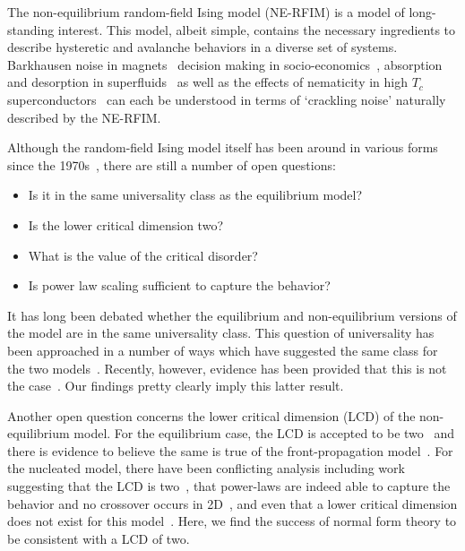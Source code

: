 \documentclass[reprint,amsmath,amssymb,aps,floatfix]{revtex4-1}
\begin{document}
The non-equilibrium random-field Ising model (NE-RFIM) is a model of long-standing interest. This model, albeit simple, contains the necessary ingredients to describe hysteretic and avalanche behaviors in a diverse set of systems. Barkhausen noise in magnets~\cite{Bertotti98} decision making in socio-economics~\cite{Bouchaud13}, absorption and desorption in superfluids~\cite{Lilly96, Detcheverry04} as well as the effects of nematicity in high $T_c$ superconductors~\cite{Bonetti04, Carlson06, Phillabaum2012} can each be understood in terms of `crackling noise' naturally described by the NE-RFIM. \par
%
Although the random-field Ising model itself has been around in various forms since the 1970s~\cite{ImryMa75}, there are still a number of open questions:
%
\begin{itemize}
	\item Is it in the same universality class as the equilibrium model?
	\item Is the lower critical dimension two?
	\item What is the value of the critical disorder?
	\item Is power law scaling sufficient to capture the behavior?
\end{itemize}
%
It has long been debated whether the equilibrium and non-equilibrium versions of the model are in the same universality class. This question of universality has been approached in a number of ways which have suggested the same class for the two models~\cite{Maritan94, Perez-Reche04, Colaiori04, LiuDahmen09, LiuDahmen09-2,BalogTissierTarjus14}. Recently, however, evidence has been provided that this is not the case~\cite{BalogTarjusTissier18}. Our findings pretty clearly imply this latter result. \par
%
Another open question concerns the lower critical dimension (LCD) of the non-equilibrium model. For the equilibrium case, the LCD is accepted to be two~\cite{BrayMoore85} and there is evidence to believe the same is true of the front-propagation model~\cite{Drossel98}. For the nucleated model, there have been conflicting analysis including work suggesting that the LCD is two~\cite{Perkovic95,Perkovic96}, that power-laws are indeed able to capture the behavior and no crossover occurs in 2D~\cite{Spasojevic11, Spasojevic11-2}, and even that a lower critical dimension does not exist for this model~\cite{Thongjaomayum13,Kurbah15,Shukla16,Shukla17}. Here, we find the success of normal form theory to be consistent with a LCD of two. \par
\end{document}
